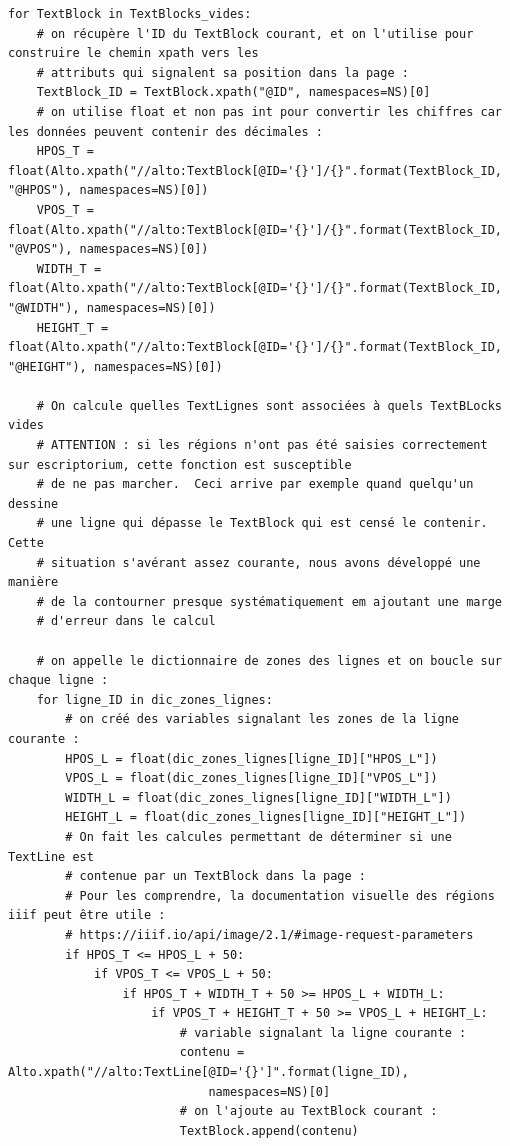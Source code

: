 \documentclass[a4paper,12pt,twoside]{book}
\begin{document}
\begin{scriptsize}
	\begin{verbatim}
for TextBlock in TextBlocks_vides:
	# on récupère l'ID du TextBlock courant, et on l'utilise pour construire le chemin xpath vers les
	# attributs qui signalent sa position dans la page :
	TextBlock_ID = TextBlock.xpath("@ID", namespaces=NS)[0]
	# on utilise float et non pas int pour convertir les chiffres car les données peuvent contenir des décimales :
	HPOS_T = float(Alto.xpath("//alto:TextBlock[@ID='{}']/{}".format(TextBlock_ID, "@HPOS"), namespaces=NS)[0])
	VPOS_T = float(Alto.xpath("//alto:TextBlock[@ID='{}']/{}".format(TextBlock_ID, "@VPOS"), namespaces=NS)[0])
	WIDTH_T = float(Alto.xpath("//alto:TextBlock[@ID='{}']/{}".format(TextBlock_ID, "@WIDTH"), namespaces=NS)[0])
	HEIGHT_T = float(Alto.xpath("//alto:TextBlock[@ID='{}']/{}".format(TextBlock_ID, "@HEIGHT"), namespaces=NS)[0])

	# On calcule quelles TextLignes sont associées à quels TextBLocks vides
	# ATTENTION : si les régions n'ont pas été saisies correctement sur escriptorium, cette fonction est susceptible
	# de ne pas marcher.  Ceci arrive par exemple quand quelqu'un dessine 
	# une ligne qui dépasse le TextBlock qui est censé le contenir. Cette 
	# situation s'avérant assez courante, nous avons développé une manière 
	# de la contourner presque systématiquement em ajoutant une marge
	# d'erreur dans le calcul
	
	# on appelle le dictionnaire de zones des lignes et on boucle sur chaque ligne :
	for ligne_ID in dic_zones_lignes:
		# on créé des variables signalant les zones de la ligne courante :
		HPOS_L = float(dic_zones_lignes[ligne_ID]["HPOS_L"])
		VPOS_L = float(dic_zones_lignes[ligne_ID]["VPOS_L"])
		WIDTH_L = float(dic_zones_lignes[ligne_ID]["WIDTH_L"])
		HEIGHT_L = float(dic_zones_lignes[ligne_ID]["HEIGHT_L"])
		# On fait les calcules permettant de déterminer si une TextLine est
		# contenue par un TextBlock dans la page :
		# Pour les comprendre, la documentation visuelle des régions iiif peut être utile :
		# https://iiif.io/api/image/2.1/#image-request-parameters
		if HPOS_T <= HPOS_L + 50:
			if VPOS_T <= VPOS_L + 50:
				if HPOS_T + WIDTH_T + 50 >= HPOS_L + WIDTH_L:
					if VPOS_T + HEIGHT_T + 50 >= VPOS_L + HEIGHT_L:
						# variable signalant la ligne courante :
						contenu = Alto.xpath("//alto:TextLine[@ID='{}']".format(ligne_ID), 
							namespaces=NS)[0]
						# on l'ajoute au TextBlock courant :
						TextBlock.append(contenu)
	\end{verbatim}
\end{scriptsize}
\end{document}
